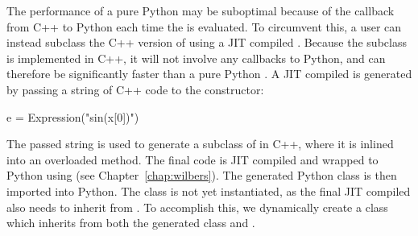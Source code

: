 The performance of a pure Python  may be suboptimal
because of the callback from C++ to Python each time the 
is evaluated. To circumvent this, a user can instead subclass the C++
version of  using a JIT compiled . Because
the subclass is implemented in C++, it will not involve any callbacks
to Python, and can therefore be significantly faster than a pure Python
. A JIT compiled  is generated by passing
a string of C++ code to the  constructor:
\begin{python}
e = Expression("sin(x[0])")
\end{python}
The passed string is used to generate a subclass of
 in C++, where it is inlined into an overloaded
 method. The final code is JIT compiled and wrapped to Python
using \instant (see Chapter~\ref{chap:wilbers}). The generated Python
class is then imported into Python. The class is not yet instantiated,
as the final JIT compiled  also needs to inherit from
. To accomplish this, we dynamically create a class
which inherits from both the generated class and .

